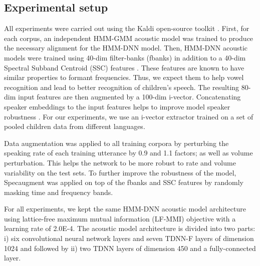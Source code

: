 

\subsection{Experimental setup}
\label{section:exp_setup}

All experiments were carried out using the Kaldi open-source toolkit \cite{kaldi}. First, for each corpus, an independent HMM-GMM acoustic model was trained to produce the necessary alignment for the HMM-DNN model. Then, HMM-DNN acoustic models were trained using  40-dim filter-banks (fbanks) in addition to a 40-dim Spectral Subband Centroid (SSC) features \cite{ssc}. These features are known to have similar properties to formant frequencies. Thus, we expect them to help vowel recognition and lead to better recognition of children's speech. 
The resulting 80-dim input features are then augmented by a 100-dim i-vector. Concatenating speaker embeddings to the input features helps to improve model speaker robustness \cite{ivector}. For our experiments, we use an i-vector extractor trained on a set of pooled children data from different languages.

Data augmentation was applied to all training corpora by perturbing the speaking rate of each training utterance by 0.9 and 1.1 factors; as well as volume perturbation. This helps the network to be more robust to rate and volume variability on the test sets. To further improve the robustness of the model, Specaugment \cite{specaugment}  was applied on top of the fbanks and SSC features by randomly masking time and frequency bands.

For all experiments, we kept the same HMM-DNN acoustic model architecture using lattice-free maximum mutual information (LF-MMI) objective with a learning rate of 2.0E-4. The acoustic model architecture is divided into two parts: i) six convolutional neural network layers and seven TDNN-F layers of dimension 1024  and followed by ii) two TDNN layers of dimension 450 and a fully-connected layer.

